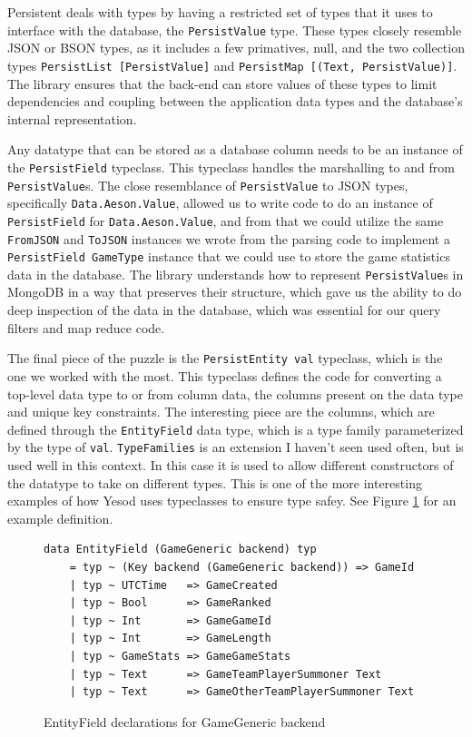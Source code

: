 \documentclass[letterpaper,twocolumn,9pt]{article}
\newcommand{\code}[1]{\texttt{#1}}
\begin{document}
Persistent deals with types by having a restricted set of types that it uses to interface with the database, the \code{PersistValue} type.  These types closely resemble JSON or BSON types, as it includes a few primatives, null, and the two collection types \code{PersistList [PersistValue]} and \code{PersistMap [(Text, PersistValue)]}.  The library ensures that the back-end can store values of these types to limit dependencies and coupling between the application data types and the database's internal representation.

Any datatype that can be stored as a database column needs to be an instance of the \code{PersistField} typeclass.  This typeclass handles the marshalling to and from \code{PersistValue}s.  The close resemblance of \code{PersistValue} to JSON types, specifically \code{Data.Aeson.Value}, allowed us to write code to do an instance of \code{PersistField} for \code{Data.Aeson.Value}, and from that we could utilize the same \code{FromJSON} and \code{ToJSON} instances we wrote from the parsing code to implement a \code{PersistField GameType} instance that we could use to store the game statistics data in the database.  The library understands how to represent \code{PersistValue}s in MongoDB in a way that preserves their structure, which gave us the ability to do deep inspection of the data in the database, which was essential for our query filters and map reduce code.

The final piece of the puzzle is the \code{PersistEntity val} typeclass, which is the one we worked with the most.  This typeclass defines the code for converting a top-level data type to or from column data, the columns present on the data type and unique key constraints.  The interesting piece are the columns, which are defined through the \code{EntityField} data type, which is a type family parameterized by the type of \code{val}.  \code{TypeFamilies} is an extension I haven't seen used often, but is used well in this context.  In this case it is used to allow different constructors of the datatype to take on different types.  This is one of the more interesting examples of how Yesod uses typeclasses to ensure type safey.  See Figure \ref{EntityField} for an example definition.

\begin{figure}[]
\begin{verbatim}
data EntityField (GameGeneric backend) typ
    = typ ~ (Key backend (GameGeneric backend)) => GameId 
    | typ ~ UTCTime   => GameCreated
    | typ ~ Bool      => GameRanked
    | typ ~ Int       => GameGameId
    | typ ~ Int       => GameLength
    | typ ~ GameStats => GameGameStats
    | typ ~ Text      => GameTeamPlayerSummoner Text
    | typ ~ Text      => GameOtherTeamPlayerSummoner Text
\end{verbatim}
    \caption{EntityField declarations for GameGeneric backend}
    \label{EntityField}
\end{figure}
\end{document}
